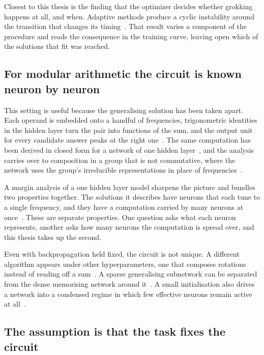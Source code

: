 Closest to this thesis is the finding that the optimizer decides whether
grokking happens at all, and when. Adaptive methods produce a cyclic
instability around the transition that changes its
timing~\cite{thilak_slingshot_2022}. That result varies a component of the
procedure and reads the consequence in the training curve, leaving open which
of the solutions that fit was reached.

\subsection{For modular arithmetic the circuit is known neuron by neuron}
\label{sec:bg_grokcircuit}

This setting is useful because the generalising solution has been taken
apart. Each operand is embedded onto a handful of frequencies, trigonometric
identities in the hidden layer turn the pair into functions of the sum, and
the output unit for every candidate answer peaks at the right
one~\cite{nanda_progress_2023}. The same computation has been derived in
closed form for a network of one hidden layer~\cite{gromov_grokking_2023}, and
the analysis carries over to composition in a group that is not commutative,
where the network uses the group's irreducible representations in place of
frequencies~\cite{chughtai_toy_2023}.

A margin analysis of a one hidden layer model sharpens the picture and bundles
two properties together. The solutions it describes have neurons that each
tune to a single frequency, and they have a computation carried by many
neurons at once~\cite{morwani_feature_2024}. These are separate properties.
One question asks what each neuron represents, another asks how many neurons
the computation is spread over, and this thesis takes up the second.

Even with backpropagation held fixed, the circuit is not unique. A different
algorithm appears under other hyperparameters, one that composes rotations
instead of reading off a sum~\cite{zhong_clock_2023}. A sparse generalising
subnetwork can be separated from the dense memorising network around
it~\cite{merrill_tale_2023}. A small initialisation also drives a network into
a condensed regime in which few effective neurons remain active at
all~\cite{luo_phase_2021}.

\subsection{The assumption is that the task fixes the circuit}
\label{sec:bg_universality}

